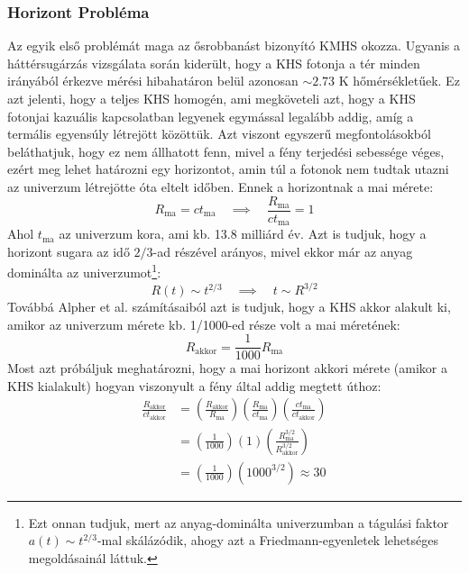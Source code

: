 \documentclass[../main.tex]{subfiles}
\begin{document}
\subsubsection*{Horizont Probléma}
Az egyik első problémát maga az ősrobbanást bizonyító KMHS okozza. Ugyanis a háttérsugárzás vizsgálata során kiderült, hogy a KHS fotonja a tér minden irányából érkezve mérési hibahatáron belül azonosan $\sim 2.73$ K
hőmérsékletűek. Ez azt jelenti, hogy a teljes KHS homogén, ami megköveteli azt, hogy a KHS fotonjai kazuális kapcsolatban legyenek egymással legalább addig, amíg a termális egyensúly létrejött közöttük.
Azt viszont egyszerű megfontolásokból beláthatjuk, hogy ez nem állhatott fenn, mivel a fény terjedési sebessége véges, ezért meg lehet határozni egy horizontot, amin túl a fotonok nem tudtak utazni az univerzum létrejötte
óta eltelt időben. Ennek a horizontnak a mai mérete:
\begin{equation}
    R_\text{ma} = c t_\text{ma} \quad \implies \quad \frac{R_\text{ma}}{c t_\text{ma}} = 1
\end{equation}
Ahol $t_\text{ma}$ az univerzum kora, ami kb. 13.8 milliárd év. Azt is tudjuk, hogy a horizont sugara az idő $2/3$-ad részével arányos, mivel ekkor már az anyag dominálta az univerzumot\footnote{
    Ezt onnan tudjuk, mert az anyag-dominálta univerzumban a tágulási faktor $a(t) \sim t^{2/3}$-mal skálázódik, ahogy azt a Friedmann-egyenletek lehetséges megoldásainál láttuk.
}:
\begin{equation}
    R(t) \sim t^{2/3} \quad \implies \quad t \sim R^{3/2}
\end{equation}
Továbbá Alpher et al. számításaiból azt is tudjuk, hogy a KHS akkor alakult ki, amikor az univerzum mérete kb. 1/1000-ed része volt a mai méretének:
\begin{equation}
    R_\text{akkor} = \frac{1}{1000} R_\text{ma}
\end{equation}
Most azt próbáljuk meghatározni, hogy a mai horizont akkori mérete (amikor a KHS kialakult) hogyan viszonyult a fény által addig megtett úthoz:
\begin{equation}
    \begin{aligned}
        \frac{R_\text{akkor}}{c t_\text{akkor}} &= \left(\frac{R_\text{akkor}}{R_\text{ma}}\right) \left(\frac{R_\text{ma}}{c t_\text{ma}}\right) \left(\frac{ct_\text{ma}}{ct_\text{akkor}}\right) \\ 
        &= \left(\frac{1}{1000}\right) (1) \left(\frac{R_\text{ma}^{3/2}}{R_\text{akkor}^{3/2}}\right) \\
        &= \left(\frac{1}{1000}\right) \left(1000^{3/2}\right) \approx 30
    \end{aligned}
\end{equation}
\end{document}
